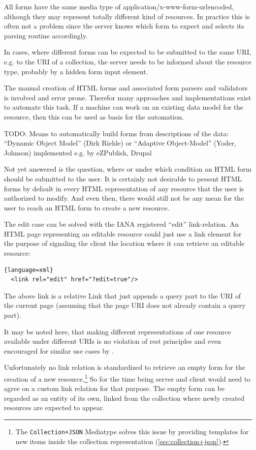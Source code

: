 \documentclass[12pt,a4paper,twoside]{scrartcl}		%
\begin{document}
All forms have the same media type of application/x-www-form-urlencoded,
although they may represent totally different kind of resources. In practice
this is often not a problem since the server knows which form to expect and
selects its parsing routine accordingly.

In cases, where different forms can be expected to be submitted to the same URI,
e.g. to the URI of a collection, the server needs to be informed about the
resource type, probably by a hidden form input element.

The manual creation of HTML forms and associated form parsers and validators is
involved and error prone. Therefor many approaches and implementations exist to
automate this task. If a machine can work on an existing data model for the
resource, then this can be used as basis for the automation.

TODO: Means to automatically build forms from descriptions of the data:
``Dynamic Object Model'' (Dirk Riehle) or ``Adaptive Object-Model'' (Yoder,
Johnson) implemented e.g. by eZPublish, Drupal

Not yet answered is the question, where or under which condition an HTML form
should be submitted to the user. It is certainly not desirable to present HTML
forms by default in every HTML representation of any resource that the user is
authorized to modify. And even then, there would still not be any mean for the
user to reach an HTML form to create a new resource.

The edit case can be solved with the IANA registered ``edit'' link-relation. An
HTML page representing an editable resource could just use a link element for
the purpose of signaling the client the location where it can retrieve an
editable resource:

\begin{lstlisting}{language=xml}
  <link rel="edit" href="?edit=true"/>
\end{lstlisting}

The above link is a relative Link that just appends a query part to the URI of
the current page (assuming that the page URI does not already contain a query
part).

It may be noted here, that making different representations of one resource
available under different URIs is no violation of rest principles and even
encouraged for similar use cases by \cite{Raman2006}.

Unfortunately no link relation is standardized to retrieve an empty form for the
creation of a new resource.\footnote{The \lstinline:Collection+JSON: Mediatype solves this issue by providing templates for new items inside the collection representation (\autoref{sec:collection+json}).}
 So for the time being server and client would need
to agree on a custom link relation for that purpose. The empty form can be
regarded as an entity of its own, linked from the collection where newly created
resources are expected to appear.
\end{document}
